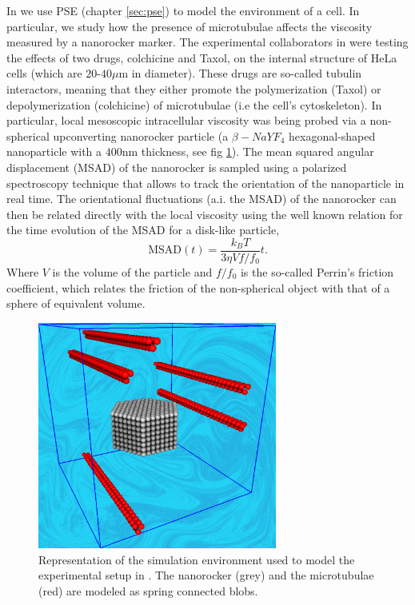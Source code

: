 \documentclass[ twoside,openright,titlepage,numbers=noenddot,%
headinclude,footinclude,cleardoublepage=empty,abstract=on,
BCOR=5mm,paper=a4,fontsize=11pt, dvipsnames
]{scrreprt}
\newcommand{\kT}{k_B T}
\begin{document}
In \cite{Pelaez2019} we use \gls{PSE} (chapter \ref{sec:pse}) to model the environment of a cell. In particular, we study how the presence of microtubulae affects the viscosity measured by a nanorocker marker.
The experimental collaborators in \cite{Pelaez2019} were testing the effects of two drugs, colchicine and Taxol, on the internal structure of HeLa cells (which are $20$-$40\mu$m in diameter). These drugs are so-called tubulin interactors, meaning that they either promote the polymerization (Taxol) or depolymerization (colchicine) of microtubulae (i.e the cell's cytoskeleton).
In particular, local mesoscopic intracellular viscosity was being probed via a non-spherical upconverting nanorocker particle (a $\beta-NaYF_4$ hexagonal-shaped nanoparticle with a $400$nm thickness, see fig \ref{fig:cellvis}). The mean squared angular displacement (MSAD) of the nanorocker is sampled using a polarized spectroscopy technique that allows to track the orientation of the nanoparticle in real time\cite{RodriguezSevilla2016}.
The orientational fluctuations (a.i. the MSAD) of the nanorocker can then be related directly with the local viscosity using the well known relation for the time evolution of the MSAD for a disk-like particle,
\begin{equation}
  \label{eq:msad}
  \text{MSAD}(t) = \frac{\kT}{3\eta V f/f_0}t.
\end{equation}
Where $V$ is the volume of the particle and $f/f_0$ is the so-called Perrin's friction coefficient, which relates the friction of the non-spherical object with that of a sphere of equivalent volume. 
\begin{figure}[H]
  \label{fig:cellvis}
  \centering
  \includegraphics[width=0.7\textwidth]{gfx/hexagon}
  \caption{Representation of the simulation environment used to model the experimental setup in \cite{Pelaez2019}. The nanorocker (grey) and the microtubulae (red) are modeled as spring connected blobs.}
\end{figure}
\end{document}
